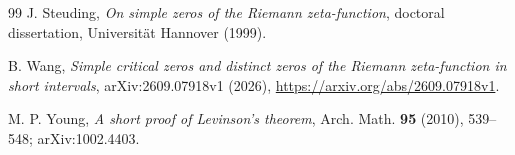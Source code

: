 \documentclass[11pt]{article}
\theoremstyle{remark}
\begin{document}
\begin{thebibliography}{99}
J. Steuding,
\emph{On simple zeros of the Riemann zeta-function},
doctoral dissertation, Universit\"at Hannover (1999).

B. Wang,
\emph{Simple critical zeros and distinct zeros of the Riemann zeta-function
in short intervals},
arXiv:2609.07918v1 (2026),
\url{https://arxiv.org/abs/2609.07918v1}.

M. P. Young,
\emph{A short proof of Levinson's theorem},
Arch. Math. \textbf{95} (2010), 539--548; arXiv:1002.4403.

\end{thebibliography}
\end{document}
